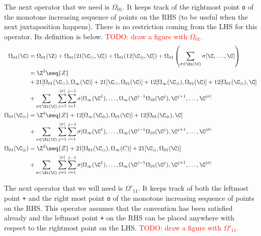 The next operator that we need is $\Omega_{01}$. It keeps track of the rightmost point \texttt{o} of the monotone increasing sequence of points on the RHS (to be useful when the next juxtaposition happens). There is no restriction coming from the LHS for this operator. Its definition is below.
\textcolor{red}{TODO: draw a figure with $\Omega_{01}$.} 
\begin{align*}
  \Omega_{01}(\C)   &= \Omega_{01}(\Z) + \Omega_{01}(21[\C_\ominus,\C]) + \Omega_{01}(12[\C_\oplus, \C]) + \Omega_{01}\left(\sum_{\sigma \in \Si(\C)}\sigma[\C,\ldots,\C]\right)\\
                    &= \Z^2\seq{Z}\\
                    &+ 21[\Omega_{01}(\C_\ominus),\Omega_\infty(\C)] + 21[\C_\ominus,\Omega_{01}(\C)] + 12[\Omega_\infty(\C_\oplus),\Omega_{01}(\C)] + 12[\Omega_{01}(\C_\oplus),\C]\\
                    &+ \sum_{\sigma \in \Si(\C)}\sum_{j=1}^{|\sigma|}\sum_{i=1}^{j-1}\sigma\vert{\Omega_\infty(\C^{1}),\ldots,\Omega_\infty(\C^{j-1}\Omega_{10}(\C^j),\C^{j+1},\ldots,\C^{|\sigma|}}\\
  \Omega_{01}(\C_\ominus) &= \Z^2\seq{Z} + 12[\Omega_\infty(\C_\oplus),\Omega_{01}(\C)] + 12[\Omega_{01}(\C_\oplus),\C]\\
                    &+ \sum_{\sigma \in \Si(\C)}\sum_{j=1}^{|\sigma|}\sum_{i=1}^{j-1}\sigma\vert{\Omega_\infty(\C^{1}),\ldots,\Omega_\infty(\C^{j-1}\Omega_{10}(\C^j),\C^{j+1},\ldots,\C^{|\sigma|}}\\
  \Omega_{01}(\C_\oplus) &= \Z^2\seq{Z} + 21[\Omega_{01}(\C_\ominus),\Omega_\infty(C)] + 21[\C_\ominus,\Omega_{01}(\C)]\\
                    &+ \sum_{\sigma \in \Si(\C)}\sum_{j=1}^{|\sigma|}\sum_{i=1}^{j-1}\sigma\vert{\Omega_\infty(\C^{1}),\ldots,\Omega_\infty(\C^{j-1}\Omega_{10}(\C^j),\C^{j+1},\ldots,\C^{|\sigma|}}\\
\end{align*}


The next operator that we will need is $\Omega'_{11}$. It keeps track of both the leftmost point \texttt{+} and the right most point \texttt{o} of the monotone increasing sequence of points on the RHS. This operator assumes that the convention has been satisfied already and the leftmost point \texttt{+} on the RHS can be placed anywhere with respect to the rightmost point on the LHS.
\textcolor{red}{TODO: draw a figure with $\Omega'_{11}$.} 

